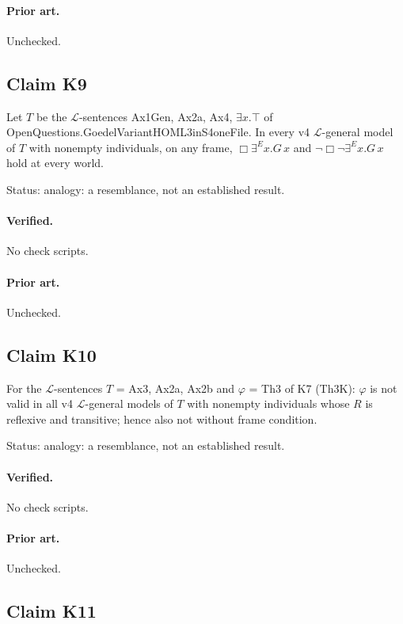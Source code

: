 \documentclass{article}
\begin{document}
\paragraph{Prior art.} Unchecked.

\subsection*{Claim K9}

Let $T$ be the $\mathcal L$-sentences Ax1Gen, Ax2a, Ax4, $\exists x.\top$ of OpenQuestions.GoedelVariantHOML3inS4oneFile. In every v4 $\mathcal L$-general model of $T$ with nonempty individuals, on any frame, $\Box\exists^E x.G\,x$ and $\neg\Box\neg\exists^E x.G\,x$ hold at every world.

Status: analogy: a resemblance, not an established result.

\paragraph{Verified.}
No check scripts.

\paragraph{Prior art.} Unchecked.

\subsection*{Claim K10}

For the $\mathcal L$-sentences $T$ = Ax3, Ax2a, Ax2b and $\varphi$ = Th3 of K7 (Th3K): $\varphi$ is not valid in all v4 $\mathcal L$-general models of $T$ with nonempty individuals whose $R$ is reflexive and transitive; hence also not without frame condition.

Status: analogy: a resemblance, not an established result.

\paragraph{Verified.}
No check scripts.

\paragraph{Prior art.} Unchecked.

\subsection*{Claim K11}
\end{document}
